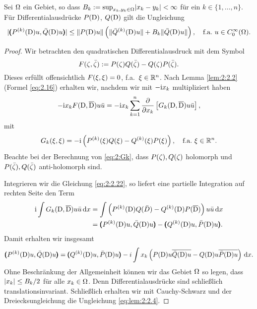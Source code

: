 \begin{lem}
Sei $\Omega$ ein Gebiet, so dass $B_k:=\sup_{x_k,y_k\in\Omega}\lvert x_k-y_k\rvert<\infty$ für ein $k\in\{1,\dots,n\}$.
Für Differentialausdrücke $P(\mathrm D)$, $Q(\mathrm D)$ gilt die Ungleichung
\begin{equation}\label{eq:lem:2:2.4}
\lvert\pmb(P^{(k)}(\mathrm D)u,\bar{Q}(\mathrm D)u\pmb)\rvert\leq\lVert P(\mathrm D)u\rVert\left(\lVert\bar{Q}^{(k)}(\mathrm D)u\rVert+B_k\lVert\bar{Q}(\mathrm D)u\rVert\right),
\quad\text{f.a.}~u\in C^\infty_0(\Omega).
\end{equation}
\end{lem}

\begin{proof}
Wir betrachten den quadratischen Differentialausdruck mit dem Symbol
\begin{equation}
F(\zeta,\bar{\zeta}):=P(\zeta)Q(\bar{\zeta})-Q(\zeta)P(\bar{\zeta}).
\end{equation}
Dieses erfüllt offensichtlich $F(\xi,\xi)=0$, f.a.~$\xi\in\mathbb R^n$.
Nach Lemma \ref{lem:2:2.2} (Formel \eqref{eq:2.16})
erhalten wir, nachdem wir mit $-\mathrm i x_k$ multipliziert haben
\begin{equation}\label{eq:2:2.22}
-\mathrm i x_kF(\mathrm D,\overline{\mathrm D})u\bar{u}=-\mathrm i x_k\sum_{k=1}^n\frac{\partial}{\partial x_k}\left[G_k(\mathrm D,\overline{\mathrm D})u\bar{u}\right],
\end{equation}
mit
\begin{equation}
G_k(\xi,\xi)=-\mathrm i\left(P^{(k)}(\xi)Q(\xi)-Q^{(k)}(\xi)P(\xi)\right),\label{eq:2:Gk}
\quad\text{f.a.}~\xi\in\mathbb R^n.
\end{equation}
Beachte bei der Berechnung von \eqref{eq:2:Gk},
dass $P(\zeta),Q(\zeta)$ holomorph
und $P(\bar{\zeta}),Q(\bar{\zeta})$ anti-holomorph sind.

Integrieren wir die Gleichung \eqref{eq:2:2.22},
so liefert eine partielle Integration auf rechten Seite den Term
\begin{align}
\mathrm i\int G_k(\mathrm D,\overline{\mathrm D})u\bar{u}\,\mathrm d x
&=\int\left(P^{(k)}(\mathrm D)Q(\bar{D})-Q^{(k)}(\mathrm D)P(\overline{\mathrm D})\right)u\bar{u}\,\mathrm d x\\
&=\pmb(P^{(k)}(\mathrm D)u,\bar{Q}(\mathrm D)u\pmb)-\pmb(Q^{(k)}(\mathrm D)u,\bar{P}(\mathrm D)u\pmb).
\end{align}
Damit erhalten wir insgesamt
\begin{equation}
\pmb(P^{(k)}(\mathrm D)u,\bar{Q}(\mathrm D)u\pmb)
=\pmb(Q^{(k)}(\mathrm D)u,\bar{P}(\mathrm D)u\pmb)-i\int x_k\left(P(\mathrm D)u\overline{\bar{Q}(\mathrm D)u}-Q(\mathrm D)u\overline{\bar{P}(\mathrm D)u}\right)\,\mathrm d x.
\end{equation}
Ohne Beschränkung der Allgemeinheit können wir das Gebiet $\Omega$ so legen,
dass $\lvert x_k\rvert\leq B_k/2$ für alle $x_k\in\Omega$.
Denn Differentialausdrücke sind schließlich translationsinvariant.
Schließlich erhalten wir mit Cauchy-Schwarz
und der Dreiecksungleichung die Ungleichung \eqref{eq:lem:2:2.4}.
\end{proof}

